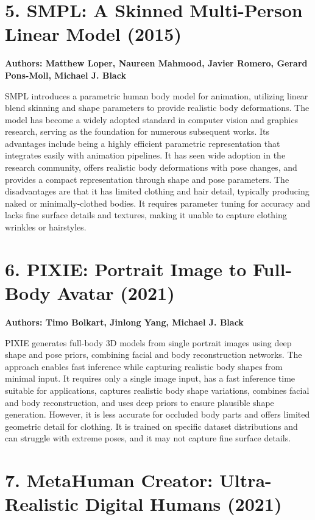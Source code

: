 \documentclass[12pt,a4paper,oneside]{report}
\begin{document}
\section*{5. SMPL: A Skinned Multi-Person Linear Model (2015)}

\textbf{Authors: Matthew Loper, Naureen Mahmood, Javier Romero, Gerard Pons-Moll, Michael J. Black}

SMPL \cite{2} introduces a parametric human body model for animation, utilizing linear blend skinning and shape parameters to provide realistic body deformations. The model has become a widely adopted standard in computer vision and graphics research, serving as the foundation for numerous subsequent works. Its advantages include being a highly efficient parametric representation that integrates easily with animation pipelines. It has seen wide adoption in the research community, offers realistic body deformations with pose changes, and provides a compact representation through shape and pose parameters. The disadvantages are that it has limited clothing and hair detail, typically producing naked or minimally-clothed bodies. It requires parameter tuning for accuracy and lacks fine surface details and textures, making it unable to capture clothing wrinkles or hairstyles.

\section*{6. PIXIE: Portrait Image to Full-Body Avatar (2021)}

\textbf{Authors: Timo Bolkart, Jinlong Yang, Michael J. Black}

PIXIE generates full-body 3D models from single portrait images using deep shape and pose priors, combining facial and body reconstruction networks. The approach enables fast inference while capturing realistic body shapes from minimal input. It requires only a single image input, has a fast inference time suitable for applications, captures realistic body shape variations, combines facial and body reconstruction, and uses deep priors to ensure plausible shape generation. However, it is less accurate for occluded body parts and offers limited geometric detail for clothing. It is trained on specific dataset distributions and can struggle with extreme poses, and it may not capture fine surface details.

\section*{7. MetaHuman Creator: Ultra-Realistic Digital Humans (2021)}
\end{document}
